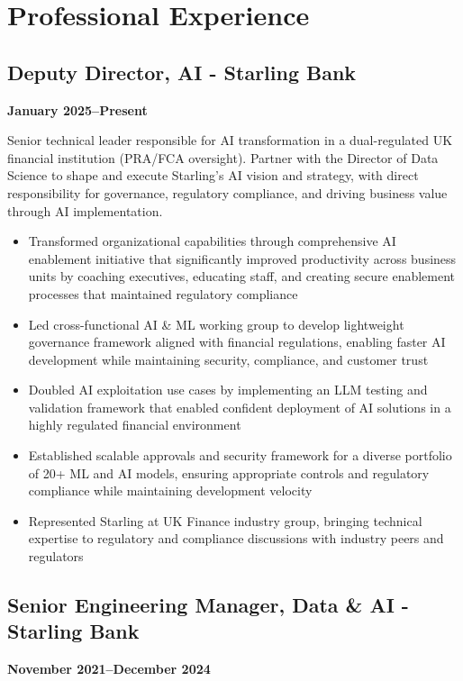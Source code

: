 \documentclass[a4paper]{scrartcl}
\begin{document}
\section*{Professional Experience}

\subsection*{Deputy Director, AI - Starling Bank}
\textbf{January 2025--Present}

Senior technical leader responsible for AI transformation in a dual-regulated UK financial institution (PRA/FCA oversight). Partner with the Director of Data Science to shape and execute Starling's AI vision and strategy, with direct responsibility for governance, regulatory compliance, and driving business value through AI implementation.
\begin{itemize}
	\item Transformed organizational capabilities through comprehensive AI enablement initiative that significantly improved productivity across business units by coaching executives, educating staff, and creating secure enablement processes that maintained regulatory compliance
	\item Led cross-functional AI \& ML working group to develop lightweight governance framework aligned with financial regulations, enabling faster AI development while maintaining security, compliance, and customer trust
	\item Doubled AI exploitation use cases by implementing an LLM testing and validation framework that enabled confident deployment of AI solutions in a highly regulated financial environment
	\item Established scalable approvals and security framework for a diverse portfolio of 20+ ML and AI models, ensuring appropriate controls and regulatory compliance while maintaining development velocity
	\item Represented Starling at UK Finance industry group, bringing technical expertise to regulatory and compliance discussions with industry peers and regulators
\end{itemize}

\subsection*{Senior Engineering Manager, Data \& AI - Starling Bank}
\textbf{November 2021--December 2024}
\end{document}
